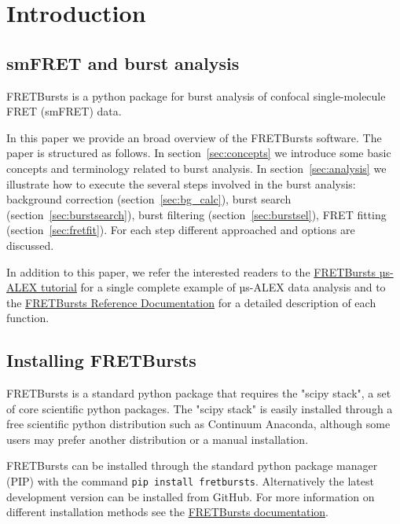 \section{Introduction}

\subsection{smFRET and burst analysis}

FRETBursts is a python package for burst analysis of confocal single-molecule
FRET (smFRET) data.

In this paper we provide an broad overview of the FRETBursts software. The 
paper is structured as follows. In section~\ref{sec:concepts} we
introduce some basic concepts and terminology related to burst analysis.
In section~\ref{sec:analysis} we illustrate how to execute the several steps involved
in the burst analysis: background correction (section~\ref{sec:bg_calc}), burst search
(section~\ref{sec:burstsearch}), burst filtering (section~\ref{sec:burstsel}), 
FRET fitting (section~\ref{sec:fretfit}). For each step different approached and options are
discussed.

In addition to this paper, we refer the interested readers to the 
\href{http://nbviewer.ipython.org/github/tritemio/FRETBursts_notebooks/blob/master/notebooks/FRETBursts%20-%20us-ALEX%20smFRET%20burst%20analysis.ipynb}{FRETBursts µs-ALEX tutorial} 
for a single complete example of µs-ALEX data analysis and to the
\href{http://fretbursts.readthedocs.org/}{FRETBursts Reference Documentation}
for a detailed description of each function.

\subsection{Installing FRETBursts}
FRETBursts is a standard python package that requires the "scipy stack", a set
of core scientific python packages.
The "scipy stack" is easily installed through a free scientific python
distribution such as Continuum Anaconda, although some users may prefer another
distribution or a manual installation.

FRETBursts can be installed through the standard python package manager (PIP)
with 
the command \texttt{pip install fretbursts}. Alternatively the latest
development version can be installed from GitHub.
For more information on different installation methods see the
\href{http://fretbursts.readthedocs.org/en/latest/installation.html}{FRETBursts
documentation}.


